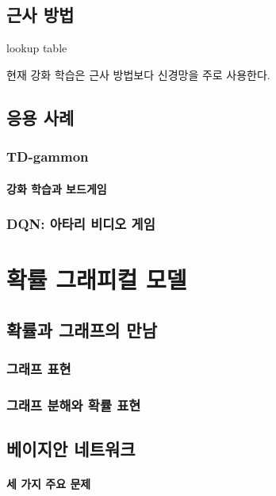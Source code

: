 \documentclass [12pt] {oblivoir}
\let\oldsubsubsection=\subsubsection
\renewcommand{\subsubsection}
{
  \filbreak
  \oldsubsubsection
}
\begin{document}
\subsection{근사 방법}

lookup table

현재 강화 학습은 근사 방법보다 신경망을 주로 사용한다.

\subsection{응용 사례}

\subsubsection{TD-gammon}

\paragraph*{강화 학습과 보드게임}\mbox{}

\vspace{3mm}

\subsubsection{DQN: 아타리 비디오 게임}

\newpage
\section{확률 그래피컬 모델}

\subsection{확률과 그래프의 만남}

\subsubsection{그래프 표현}

\subsubsection{그래프 분해와 확률 표현}

\subsection{베이지안 네트워크}

\paragraph*{세 가지 주요 문제}\mbox{}
\end{document}
